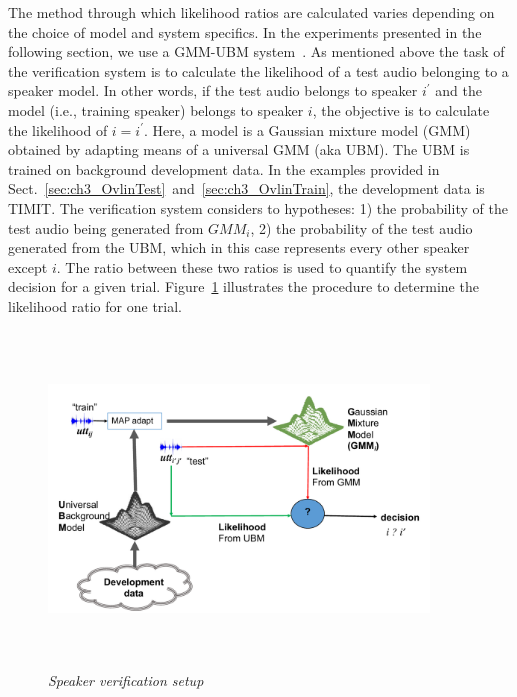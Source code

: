 The method through which likelihood ratios are calculated varies depending on the choice of model and system specifics. 
In the experiments presented in the following section, we use a GMM-UBM system~\cite{reynolds_map}. 
As mentioned above the task of the verification system is to calculate the likelihood of a test audio belonging to a speaker model. 
In other words, if the test audio belongs to speaker $i^\prime$ and the model (i.e., training speaker) belongs to speaker $i$, the objective is to calculate the likelihood of $i=i^\prime$. 
Here, a model is a Gaussian mixture model (GMM) obtained by adapting means of a universal GMM (aka UBM). 
The UBM is trained on background development data. 
In the examples provided in Sect.~\ref{sec:ch3_OvlinTest}~and~\ref{sec:ch3_OvlinTrain}, the development data is TIMIT. 
The verification system considers to hypotheses: 1) the probability of the test audio being generated from $GMM_i$, 2) the probability of the test audio generated from the UBM, which in this case represents every other speaker except $i$. 
The ratio between these two ratios is used to quantify the system decision for a given trial. 
Figure~\ref{fig:gmm_ubm_sid} illustrates the procedure to determine the likelihood ratio for one trial. 

\begin{figure}[h!]
	\centering
	\vspace{0mm}
	\includegraphics[height = 3.5in, width=0.9\textwidth]{figures/gmm_ubm_sid_setup}
	\vspace{-3mm}
	\caption{\it Speaker verification setup}
	\label{fig:gmm_ubm_sid}
	\vspace{0mm}
\end{figure}

